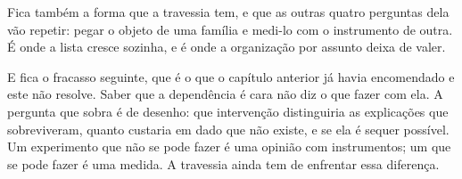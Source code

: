 Fica também a forma que a travessia tem, e que as outras quatro perguntas dela vão repetir: pegar
o objeto de uma família e medi-lo com o instrumento de outra. É onde a lista cresce
sozinha, e é onde a organização por assunto deixa de valer.

E fica o fracasso seguinte, que é o que o capítulo anterior já havia encomendado e este não
resolve. Saber que a dependência é cara não diz o que fazer com ela. A pergunta que sobra é de
desenho: que intervenção distinguiria as explicações que sobreviveram, quanto custaria em dado que
não existe, e se ela é sequer possível. Um experimento que não se pode fazer é uma opinião com
instrumentos; um que se pode fazer é uma medida. A travessia ainda tem de enfrentar essa
diferença.
